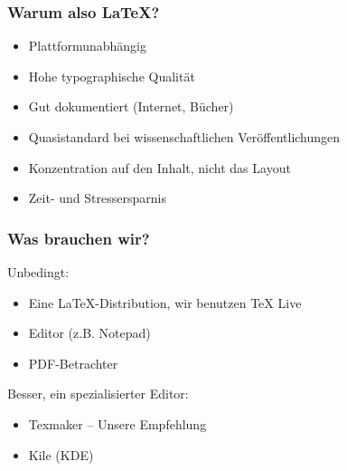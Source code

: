 \begin{frame}
    \frametitle{Warum also \LaTeX?{}}
    \begin{itemize}
        \item Plattformunabhängig\pause
        \item Hohe typographische Qualität\pause
        \item Gut dokumentiert (Internet, Bücher)\pause
        \item Quasistandard bei wissenschaftlichen Veröffentlichungen\pause
        \item Konzentration auf den Inhalt, nicht das Layout\pause
        \item Zeit- und Stressersparnis
    \end{itemize}
\end{frame}

\begin{frame}
    \frametitle{Was brauchen wir?}
    Unbedingt:
    \begin{itemize}
        \item Eine \LaTeX{}-Distribution, wir benutzen TeX Live\pause
        \item Editor (z.B. Notepad)\pause
        \item PDF-Betrachter
    \end{itemize}
    \pause
    \bigskip
    Besser, ein spezialisierter Editor:
    \begin{itemize}
        \item Texmaker -- Unsere Empfehlung
        \item Kile (KDE)
    \end{itemize}
\end{frame}

